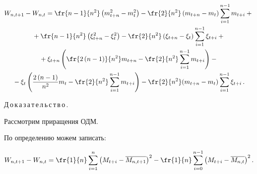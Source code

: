         \begin{multline}


                W_{n,t+1} - W_{n,t} =


                \fr{n-1}{n^2}\left(m^2_{t+n} - m^2_t\right) -


                \fr{2}{n^2}\left(m_{t+n}-m_t\right)\sum\limits^{n-1}_{i=1}m_{t+i} + {}\\


                {}+


                \fr{n-1}{n^2}\left(\xi^2_{t+n} - \xi^2_t\right) -


                \fr{2}{n^2}\left(\xi_{t+n}-\xi_t\right)\sum\limits^{n-1}_{i=1}


                \xi_{t+i} +{} \\


                {}+


                \xi_{t+n}\left(\fr{2\left(n-1\right)}{n^2}m_{t+n} -


                \fr{2}{n^2}\sum\limits^{n-1}_{i=1}m_{t+i}\right) - {}\\


                {}- \xi_t\left(\frac{2\left(n-1\right)}{n^2}m_t -


                \fr{2}{n^2}\sum\limits^{n-1}_{i=1}m_{t+i}\right) - \fr{2}{n^2}(m_{t+n}-m_t)\sum\limits^{n-1}_{i=1}\xi_{t+i}\,.


                            \label{window_dispersion_increment}


        \end{multline}








\noindent


Д\,о\,к\,а\,з\,а\,т\,е\,л\,ь\,с\,т\,в\,о\,.\ \


    Рассмотрим приращения ОДМ.


    По определению можем записать:


    \begin{equation*}


        W_{n,t+1} - W_{n,t} =


            \fr{1}{n}\sum\limits^{n}_{i=1}\left(M_{t+i} -


            \overline{M_{n,t+1}}\right)^2 - \fr{1}{n}\sum\limits^{n-1}_{i=0}


            \left(M_{t+i} - \overline{M_{n,t}}\right)^2.


    \end{equation*}





